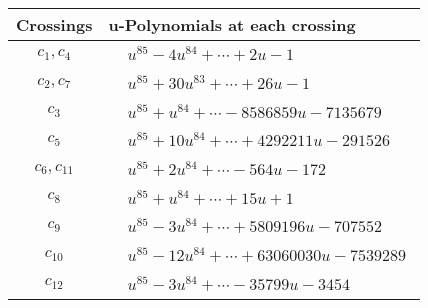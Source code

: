 \documentclass[1p]{elsarticle_modified}
\theoremstyle{definition}
\begin{document}
\begin{tabular}{m{50pt}|m{274pt}}
Crossings & \hspace{64pt}u-Polynomials at each crossing \\
\hline $$\begin{aligned}c_{1},c_{4}\end{aligned}$$&$\begin{aligned}
&u^{85}-4 u^{84}+\cdots+2 u-1
\end{aligned}$\\
\hline $$\begin{aligned}c_{2},c_{7}\end{aligned}$$&$\begin{aligned}
&u^{85}+30 u^{83}+\cdots+26 u-1
\end{aligned}$\\
\hline $$\begin{aligned}c_{3}\end{aligned}$$&$\begin{aligned}
&u^{85}+u^{84}+\cdots-8586859 u-7135679
\end{aligned}$\\
\hline $$\begin{aligned}c_{5}\end{aligned}$$&$\begin{aligned}
&u^{85}+10 u^{84}+\cdots+4292211 u-291526
\end{aligned}$\\
\hline $$\begin{aligned}c_{6},c_{11}\end{aligned}$$&$\begin{aligned}
&u^{85}+2 u^{84}+\cdots-564 u-172
\end{aligned}$\\
\hline $$\begin{aligned}c_{8}\end{aligned}$$&$\begin{aligned}
&u^{85}+u^{84}+\cdots+15 u+1
\end{aligned}$\\
\hline $$\begin{aligned}c_{9}\end{aligned}$$&$\begin{aligned}
&u^{85}-3 u^{84}+\cdots+5809196 u-707552
\end{aligned}$\\
\hline $$\begin{aligned}c_{10}\end{aligned}$$&$\begin{aligned}
&u^{85}-12 u^{84}+\cdots+63060030 u-7539289
\end{aligned}$\\
\hline $$\begin{aligned}c_{12}\end{aligned}$$&$\begin{aligned}
&u^{85}-3 u^{84}+\cdots-35799 u-3454
\end{aligned}$\\
\hline
\end{tabular}\\~\\
\end{document}
